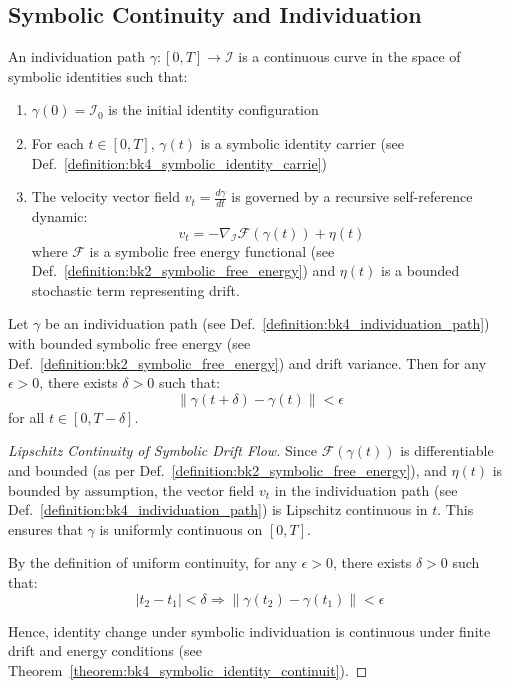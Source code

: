 \subsection{Symbolic Continuity and Individuation} \label{subsec:bk4_symbolic_continuity_individuation}
\begin{definition} \label{definition:bk4_individuation_path}
An individuation path $\gamma: [0, T] \to \mathcal{I}$ is a continuous curve in the space of symbolic identities such that:
\begin{enumerate}
    \item $\gamma(0) = \mathcal{I}_0$ is the initial identity configuration
    \item For each $t \in [0,T]$, $\gamma(t)$ is a symbolic identity carrier (see Def.~\ref{definition:bk4_symbolic_identity_carrie})
    \item The velocity vector field $v_t = \frac{d\gamma}{dt}$ is governed by a recursive self-reference dynamic:
    \begin{equation}
        v_t = -\nabla_{\mathcal{I}} \mathcal{F}(\gamma(t)) + \eta(t)
    \end{equation}
    where $\mathcal{F}$ is a symbolic free energy functional (see Def.~\ref{definition:bk2_symbolic_free_energy}) and $\eta(t)$ is a bounded stochastic term representing drift.
\end{enumerate}
\end{definition}
\begin{theorem} \label{theorem:bk4_symbolic_identity_continuit}
Let $\gamma$ be an individuation path (see Def.~\ref{definition:bk4_individuation_path}) with bounded symbolic free energy (see Def.~\ref{definition:bk2_symbolic_free_energy}) and drift variance. Then for any $\epsilon > 0$, there exists $\delta > 0$ such that:
\begin{equation}
    \|\gamma(t + \delta) - \gamma(t)\| < \epsilon
\end{equation}
for all $t \in [0, T - \delta]$.
\end{theorem}

\begin{proof}[Lipschitz Continuity of Symbolic Drift Flow]
\label{proof:bk4_lipschitz_continuity_symbolic_drift}
Since $\mathcal{F}(\gamma(t))$ is differentiable and bounded 
(as per Def.~\ref{definition:bk2_symbolic_free_energy}), 
and $\eta(t)$ is bounded by assumption, 
the vector field $v_t$ in the individuation path 
(see Def.~\ref{definition:bk4_individuation_path}) 
is Lipschitz continuous in $t$. 
This ensures that $\gamma$ is uniformly continuous on $[0,T]$.

By the definition of uniform continuity, for any $\epsilon > 0$, there exists $\delta > 0$ such that:
\begin{equation}
    |t_2 - t_1| < \delta \Rightarrow \|\gamma(t_2) - \gamma(t_1)\| < \epsilon
\end{equation} 

Hence, identity change under symbolic individuation is continuous under finite drift and energy conditions (see Theorem~\ref{theorem:bk4_symbolic_identity_continuit}).
\end{proof}
